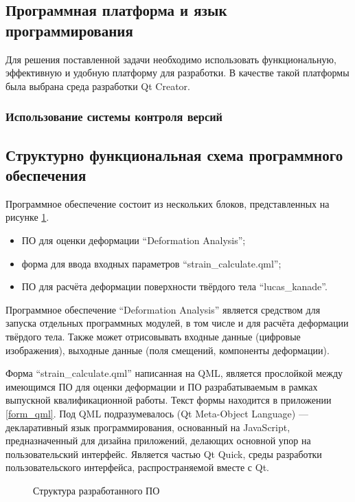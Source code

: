 \subsection {Программная платформа и язык программирования}
Для решения поставленной задачи необходимо использовать функциональную, эффективную и удобную платформу для разработки. В качестве такой платформы была выбрана среда разработки Qt Creator.

\subsubsection {Использование системы контроля версий}

\subsection{Структурно функциональная схема программного обеспечения}%

Программное обеспечение состоит из нескольких блоков, представленных на рисунке \ref{pic:shema_PO}.

\begin{itemize}
\item ПО для оценки деформации ``Deformation Analysis'';
\item форма для ввода входных параметров ``strain\_calculate.qml'';
\item ПО для расчёта деформации поверхности твёрдого тела ``lucas\_kanade''.
\end{itemize}

Программное обеспечение ``Deformation Analysis'' является средством для запуска отдельных программных модулей, в том числе и для расчёта деформации твёрдого тела. Также может отрисовывать входные данные (цифровые изображения), выходные данные (поля смещений, компоненты деформации). 

Форма ``strain\_calculate.qml'' написанная на QML, является прослойкой между имеющимся ПО для оценки деформации и ПО разрабатываемым в рамках выпускной квалификационной работы. Текст формы находится в приложении \ref{form_qml}. Под QML подразумевалось (Qt Meta-Object Language) — декларативный язык программирования, основанный на JavaScript, предназначенный для дизайна приложений, делающих основной упор на пользовательский интерфейс. Является частью Qt Quick, среды разработки пользовательского интерфейса, распространяемой вместе с Qt.

\begin{figure}[h!]
\caption{Структура разработанного ПО}
\label{pic:shema_PO}
\end{figure}

